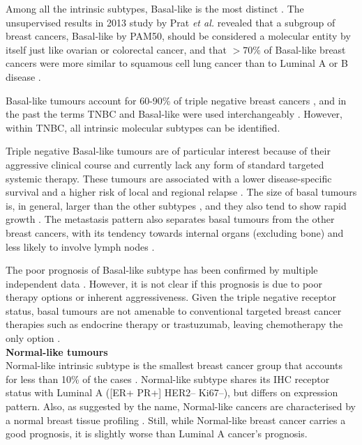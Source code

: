 Among all the intrinsic subtypes, Basal-like is the most distinct \cite{TCGAComprehensiveTumors}. The unsupervised results in 2013 study by Prat \textit{et al.} \cite{prat2013genomic}  revealed that a subgroup of breast cancers, Basal-like by PAM50, should be considered a molecular entity by itself just like ovarian or colorectal cancer, and that $>70\%$ of Basal-like breast cancers were more similar to squamous cell lung cancer than to Luminal A or B disease \cite{prat2013genomic}. 

Basal-like tumours account for 60-90\% of triple negative breast cancers \cite{fan2006concordance}, and in the past the terms TNBC and Basal-like were used interchangeably \cite{Vidal2017}. However, within TNBC, all intrinsic molecular subtypes can be identified. 

Triple negative Basal-like tumours are of particular interest because of their aggressive clinical course and currently lack any form of standard targeted systemic therapy. These tumours are associated with a lower disease-specific survival and a higher risk of local and regional relapse \cite{hudis2011triple}. 
The size of basal tumours is, in general, larger than the other subtypes \cite{rakha2006morphological}, and they also tend to show rapid growth \cite{ho2012characterization}. The metastasis pattern also separates basal tumours from the other breast cancers, with its tendency towards internal organs (excluding bone) and less likely to involve lymph nodes \cite{ho2012characterization}. 

The poor prognosis of Basal-like subtype  has been confirmed by multiple independent data \cite{brenton2005molecular}. However, it is not clear if this prognosis is due to poor therapy options or inherent aggressiveness. Given the triple negative receptor status,  basal tumours are not amenable to conventional targeted breast cancer therapies such as endocrine therapy or trastuzumab, leaving chemotherapy the only option \cite{brenton2005molecular, Dai2015}. \\


\textbf{Normal-like tumours }\\
Normal-like intrinsic subtype is the smallest breast cancer group that accounts for less than 10\% of the cases \cite{Dai2015}. Normal-like subtype shares its IHC receptor status with Luminal A ([ER+ PR+] HER2-- Ki67--), but differs on expression pattern. Also, as suggested by the name, Normal-like cancers are characterised by a normal breast tissue profiling \cite{perou2000molecular}. Still, while Normal-like breast cancer carries a good prognosis, it is slightly worse than Luminal A cancer’s prognosis.\\




























